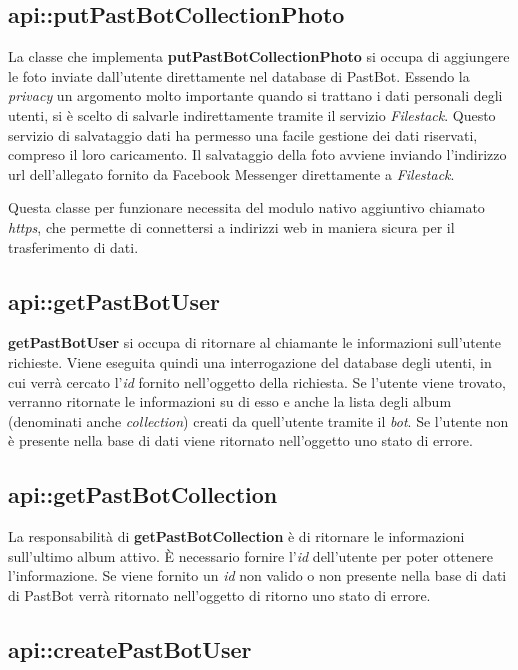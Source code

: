 \subsection{api::putPastBotCollectionPhoto}

La classe che implementa \textbf{putPastBotCollectionPhoto} si occupa di
aggiungere le foto inviate dall'utente direttamente nel database di PastBot.
Essendo la \textit{privacy} un argomento molto importante quando si trattano i
dati personali degli utenti, si è scelto di salvarle indirettamente tramite il
servizio \textit{Filestack}. Questo servizio di salvataggio dati ha permesso
una facile gestione dei dati riservati, compreso il loro caricamento. Il
salvataggio della foto avviene inviando l'indirizzo \gls{url} dell'allegato
fornito da Facebook Messenger direttamente a \textit{Filestack}.


Questa classe per funzionare necessita del modulo nativo aggiuntivo chiamato
\textit{https}, che permette di connettersi a indirizzi web in maniera sicura
per il trasferimento di dati.

\subsection{api::getPastBotUser}

\textbf{getPastBotUser} si occupa di ritornare al chiamante le informazioni
sull'utente richieste. Viene eseguita quindi una interrogazione del database
degli utenti, in cui verrà cercato l'\textit{id} fornito nell'oggetto della
richiesta. Se l'utente viene trovato, verranno ritornate le informazioni su di
esso e anche la lista degli album (denominati anche \textit{collection}) creati
da quell'utente tramite il \textit{bot}.
Se l'utente non è presente nella base di dati viene ritornato nell'oggetto uno
stato di errore.

\subsection{api::getPastBotCollection}

La responsabilità di \textbf{getPastBotCollection} è di ritornare le
informazioni sull'ultimo album attivo. È necessario fornire l'\textit{id}
dell'utente per poter ottenere l'informazione.
Se viene fornito un \textit{id} non valido o non presente nella base di dati di
PastBot verrà ritornato nell'oggetto di ritorno uno stato di errore.

\subsection{api::createPastBotUser}

